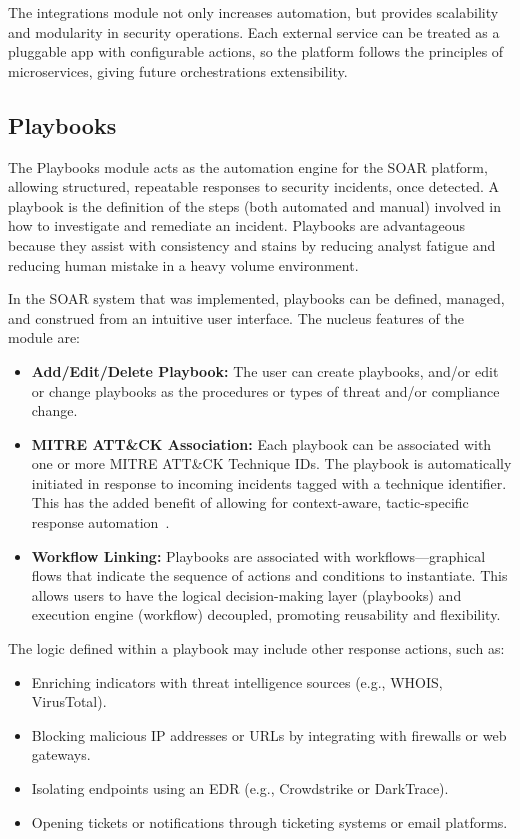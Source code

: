 The integrations module not only increases automation, but provides scalability and modularity in security operations. Each external service can be treated as a pluggable app with configurable actions, so the platform follows the principles of microservices, giving future orchestrations extensibility.

\subsection{Playbooks}

The Playbooks module acts as the automation engine for the SOAR platform, allowing structured, repeatable responses to security incidents, once detected. A playbook is the definition of the steps (both automated and manual) involved in how to investigate and remediate an incident. Playbooks are advantageous because they assist with consistency and stains by reducing analyst fatigue and reducing human mistake in a heavy volume environment.

In the SOAR system that was implemented, playbooks can be defined, managed, and construed from an intuitive user interface. The nucleus features of the module are:

\begin{itemize}[noitemsep,topsep=0pt]
    \item \textbf{Add/Edit/Delete Playbook:} The user can create playbooks, and/or edit or change playbooks as the procedures or types of threat and/or compliance change.
    
    \item \textbf{MITRE ATT\&CK Association:} Each playbook can be associated with one or more MITRE ATT\&CK Technique IDs. The playbook is automatically initiated in response to incoming incidents tagged with a technique identifier. This has the added benefit of allowing for context-aware, tactic-specific response automation~\cite{mitre}.
    
    \item \textbf{Workflow Linking:} Playbooks are associated with workflows—graphical flows that indicate the sequence of actions and conditions to instantiate. This allows users to have the logical decision-making layer (playbooks) and execution engine (workflow) decoupled, promoting reusability and flexibility.
\end{itemize}

The logic defined within a playbook may include other response actions, such as:
\begin{itemize}[noitemsep,topsep=0pt]
    \item Enriching indicators with threat intelligence sources (e.g., WHOIS, VirusTotal).
    \item Blocking malicious IP addresses or URLs by integrating with firewalls or web gateways.
    \item Isolating endpoints using an EDR (e.g., Crowdstrike or DarkTrace).
    \item Opening tickets or notifications through ticketing systems or email platforms.
\end{itemize}


